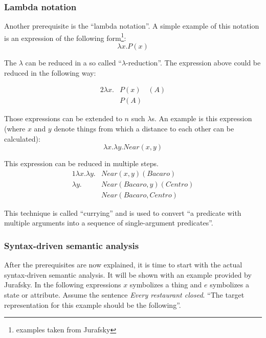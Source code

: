 \documentclass[12pt,twoside]{scrartcl}
\theoremstyle{plain}
\theoremstyle{definition}
\theoremstyle{remark}
\begin{document}
		\subsubsection*{Lambda notation}
		\label{subSubSec:lambdaNotation}
		
		Another prerequisite is the ``lambda notation''\cite[p.~593]{Jurafsky2009a}. A simple example of this notation is an expression of the following form\footnote{examples taken from Jurafsky\cite[pp.~593-594]{Jurafsky2009a}}:		
		\[
			\lambda x.P(x)
		\]
		
		The $\lambda$ can be reduced in a so called ``$\lambda$-reduction''\cite[p.~593]{Jurafsky2009a}. The expression above could be reduced in the following way:
		
		\begin{alignat*}{2}
			\lambda x.&P(x)&(A) \\
			&P(A)&
		\end{alignat*}
		
		Those expressions can be extended to $n$ such $\lambda$s. An example is this expression (where $x$ and $y$ denote things from which a distance to each other can be calculated):
		\[
			\lambda x.\lambda y.Near(x,y)
		\]
				
		This expression can be reduced in multiple steps.
		\begin{alignat*}{1}
			\lambda x.\lambda y.&Near(x,y)(Bacaro) \\
			\lambda y.&Near(Bacaro, y)(Centro) \\
			&Near(Bacaro, Centro)
		\end{alignat*}
				
		This technique is called ``currying''\cite[p.~594]{Jurafsky2009a} and is used to convert ``a predicate with multiple arguments into a sequence of single-argument predicates''\cite[p.~594]{Jurafsky2009a}.
		
		\subsubsection*{Syntax-driven semantic analysis}
		\label{subSubSec:syntaxDrivenSemanticAnalysis}
		
		After the prerequisites are now explained, it is time to start with the actual syntax-driven semantic analysis. It will be shown with an example provided by Jurafsky. In the following expressions $x$ symbolizes a thing and $e$ symbolizes a state or attribute. Assume the sentence \textit{Every restaurant closed}. ``The target representation for this example should be the following''\cite[p.~621]{Jurafsky2009}.
		
\end{document}
